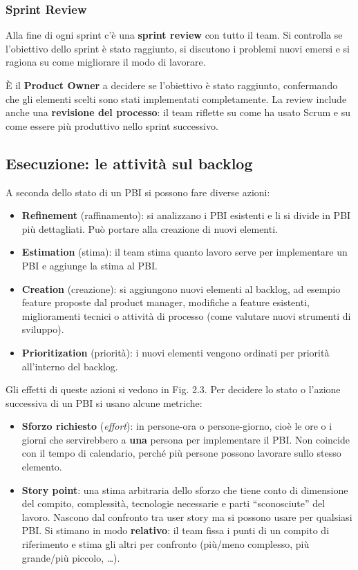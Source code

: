 \subsubsection{Sprint Review}\label{sprint-review}

Alla fine di ogni sprint c'è una \textbf{sprint review} con tutto il
team. Si controlla se l'obiettivo dello sprint è stato raggiunto, si
discutono i problemi nuovi emersi e si ragiona su come migliorare il
modo di lavorare.

È il \textbf{Product Owner} a decidere se l'obiettivo è stato raggiunto,
confermando che gli elementi scelti sono stati implementati
completamente. La review include anche una \textbf{revisione del
processo}: il team riflette su come ha usato Scrum e su come essere più
produttivo nello sprint successivo.

\subsection{Esecuzione: le attività sul
backlog}\label{esecuzione-le-attivituxe0-sul-backlog}

A seconda dello stato di un PBI si possono fare diverse azioni:

\begin{itemize}
\tightlist
\item
  \textbf{Refinement} (raffinamento): si analizzano i PBI esistenti e li
  si divide in PBI più dettagliati. Può portare alla creazione di nuovi
  elementi.
\item
  \textbf{Estimation} (stima): il team stima quanto lavoro serve per
  implementare un PBI e aggiunge la stima al PBI.
\item
  \textbf{Creation} (creazione): si aggiungono nuovi elementi al
  backlog, ad esempio feature proposte dal product manager, modifiche a
  feature esistenti, miglioramenti tecnici o attività di processo (come
  valutare nuovi strumenti di sviluppo).
\item
  \textbf{Prioritization} (priorità): i nuovi elementi vengono ordinati
  per priorità all'interno del backlog.
\end{itemize}

Gli effetti di queste azioni si vedono in Fig. 2.3. Per decidere lo
stato o l'azione successiva di un PBI si usano alcune metriche:

\begin{itemize}
\tightlist
\item
  \textbf{Sforzo richiesto} (\emph{effort}): in persone-ora o
  persone-giorno, cioè le ore o i giorni che servirebbero a \textbf{una}
  persona per implementare il PBI. Non coincide con il tempo di
  calendario, perché più persone possono lavorare sullo stesso elemento.
\item
  \textbf{Story point}: una stima arbitraria dello sforzo che tiene
  conto di dimensione del compito, complessità, tecnologie necessarie e
  parti ``sconosciute'' del lavoro. Nascono dal confronto tra user story
  ma si possono usare per qualsiasi PBI. Si stimano in modo
  \textbf{relativo}: il team fissa i punti di un compito di riferimento
  e stima gli altri per confronto (più/meno complesso, più grande/più
  piccolo, \ldots).
\end{itemize}

